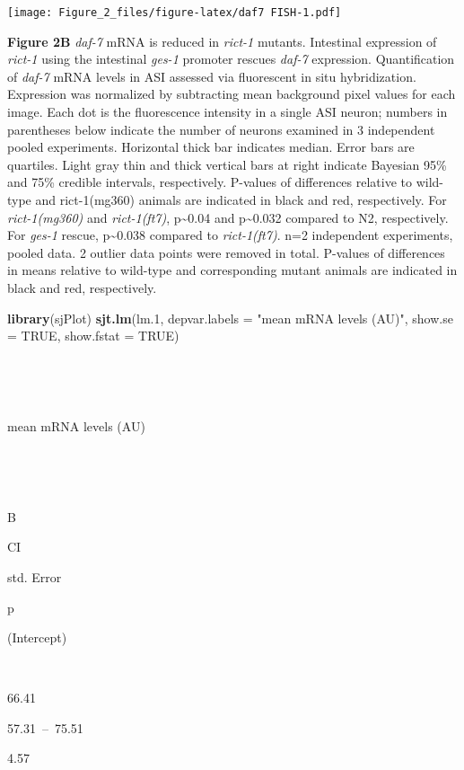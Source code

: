 \documentclass[]{article}
\newenvironment{Shaded}{\begin{snugshade}}{\end{snugshade}}
\newcommand{\KeywordTok}[1]{\textcolor[rgb]{0.13,0.29,0.53}{\textbf{#1}}}
\newcommand{\DataTypeTok}[1]{\textcolor[rgb]{0.13,0.29,0.53}{#1}}
\newcommand{\DecValTok}[1]{\textcolor[rgb]{0.00,0.00,0.81}{#1}}
\newcommand{\StringTok}[1]{\textcolor[rgb]{0.31,0.60,0.02}{#1}}
\newcommand{\OtherTok}[1]{\textcolor[rgb]{0.56,0.35,0.01}{#1}}
\newcommand{\NormalTok}[1]{#1}
\begin{document}
\texttt{[image: Figure\_2\_files/figure-latex/daf7 FISH-1.pdf]}

\textbf{Figure 2B} \emph{daf-7} mRNA is reduced in \emph{rict-1}
mutants. Intestinal expression of \emph{rict-1} using the intestinal
\emph{ges-1} promoter rescues \emph{daf-7} expression. Quantification of
\emph{daf-7} mRNA levels in ASI assessed via fluorescent in situ
hybridization. Expression was normalized by subtracting mean background
pixel values for each image. Each dot is the fluorescence intensity in a
single ASI neuron; numbers in parentheses below indicate the number of
neurons examined in 3 independent pooled experiments. Horizontal thick
bar indicates median. Error bars are quartiles. Light gray thin and
thick vertical bars at right indicate Bayesian 95\% and 75\% credible
intervals, respectively. P-values of differences relative to wild-type
and rict-1(mg360) animals are indicated in black and red, respectively.
For \emph{rict-1(mg360)} and \emph{rict-1(ft7)}, p\textasciitilde{}0.04
and p\textasciitilde{}0.032 compared to N2, respectively. For
\emph{ges-1} rescue, {p\textasciitilde{}0.038} compared to
\emph{rict-1(ft7)}. n=2 independent experiments, pooled data. 2 outlier
data points were removed in total. P-values of differences in means
relative to wild-type and corresponding mutant animals are indicated in
black and red, respectively.

\begin{Shaded}
\begin{Highlighting}[]
\KeywordTok{library}\NormalTok{(sjPlot)}
\KeywordTok{sjt.lm}\NormalTok{(lm.}\DecValTok{1}\NormalTok{, }\DataTypeTok{depvar.labels =} \StringTok{"mean mRNA levels (AU)"}\NormalTok{, }\DataTypeTok{show.se =} \OtherTok{TRUE}\NormalTok{, }\DataTypeTok{show.fstat =} \OtherTok{TRUE}\NormalTok{)}
\end{Highlighting}
\end{Shaded}

~

~

mean mRNA levels (AU)

~

~

B

CI

std. Error

p

(Intercept)

~

66.41

57.31~--~75.51

4.57
\end{document}
